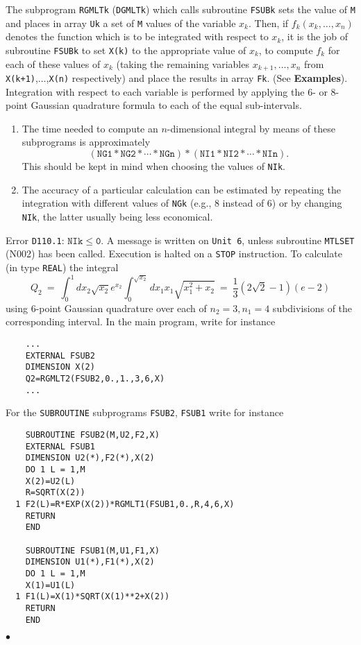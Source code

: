 The subprogram {\tt RGMLTk} ({\tt DGMLTk}) which calls subroutine
{\tt FSUBk}
sets the value of {\tt M} and places in array {\tt Uk} a set of {\tt M}
values of the variable $x_k$. Then, if $f_k(x_k,\ldots,x_n)$ denotes
the function which is to be integrated with respect to $x_k$, it is the
job of subroutine {\tt FSUBk} to set {\tt X(k)} to the appropriate
value of $x_k$, to compute $f_k$ for each of these values of $x_k$
(taking the remaining variables $x_{k+1},\ldots,x_n$ from
{\tt X(k+1)},$\ldots$,{\tt X(n)} respectively) and place the results in
array {\tt Fk}. (See {\bf Examples}).
\Method
Integration with respect to each variable is performed by applying the
6- or 8-point Gaussian quadrature formula to each of the equal
sub-intervals.
\Notes
\begin{enumerate}
\item The time needed to compute an $n$-dimensional integral by means
of these subprograms is approximately
$$\mathtt{(NG1*NG2*\cdots*NGn)*(NI1*NI2*\cdots*NIn)}.$$
This should be kept in mind when choosing the values of {\tt NIk}.
\item The accuracy of a particular calculation can be estimated by
repeating the integration with different values of {\tt NGk} (e.g.,
8 instead of 6) or by changing {\tt NIk}, the latter usually being less
economical.
\end{enumerate}
\Errorh
Error {\tt D110.1}: $\mathtt{NIk \le 0}$. A message is written on
{\tt Unit 6}, unless subroutine {\tt MTLSET} (N002) has been called.
Execution is halted on a {\tt STOP} instruction.
\Examples
To calculate (in type {\tt REAL}) the integral
$$ Q_2 \ = \
\displaystyle \int_0^1 dx_2 \sqrt{x_2} e^{x_2}
\displaystyle \int_0^{\sqrt{x_2}} dx_1 x_1 \sqrt{x_1^2+x_2} \ = \
\frac{1}{3} (2\sqrt{2}-1)(e-2)$$
using 6-point Gaussian quadrature over each of $n_2 = 3, n_1 = 4$
subdivisions of the corresponding interval.
In the main program, write for instance
\newpage
\begin{verbatim}
    ...
    EXTERNAL FSUB2
    DIMENSION X(2)
    Q2=RGMLT2(FSUB2,0.,1.,3,6,X)
    ...
\end{verbatim}
For the {\tt SUBROUTINE} subprograms {\tt FSUB2}, {\tt FSUB1} write
for instance
\begin{verbatim}
    SUBROUTINE FSUB2(M,U2,F2,X)
    EXTERNAL FSUB1
    DIMENSION U2(*),F2(*),X(2)
    DO 1 L = 1,M
    X(2)=U2(L)
    R=SQRT(X(2))
  1 F2(L)=R*EXP(X(2))*RGMLT1(FSUB1,0.,R,4,6,X)
    RETURN
    END
 
    SUBROUTINE FSUB1(M,U1,F1,X)
    DIMENSION U1(*),F1(*),X(2)
    DO 1 L = 1,M
    X(1)=U1(L)
  1 F1(L)=X(1)*SQRT(X(1)**2+X(2))
    RETURN
    END
\end{verbatim}
$\bullet$
